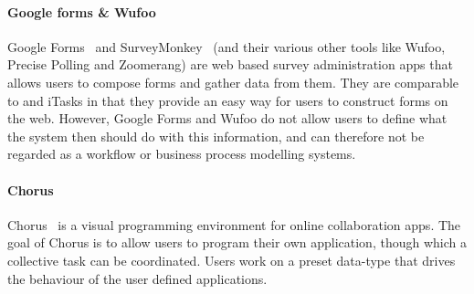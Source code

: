 \paragraph{Google forms \& Wufoo}

Google Forms~\cite{googleforms} and SurveyMonkey~\cite{wufoo} (and their various other tools like Wufoo, Precise Polling and Zoomerang) are web based survey administration apps that allows
users to compose forms and gather data from them. They are comparable to \TOP and
iTasks in that they provide an easy way for users to construct forms on the web.
However, Google Forms and Wufoo do not allow users to define what the system
then should do with this information, and can therefore not be regarded as a
workflow or business process modelling systems.

\paragraph{Chorus} %

Chorus~\cite{chen2017chorus} is a visual programming environment for online
collaboration apps. The goal of Chorus is to allow users to program their own
application, though which a collective task can be coordinated. Users work on a
preset data-type that drives the behaviour of the user defined applications.
